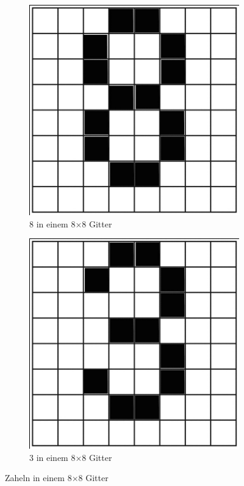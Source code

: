 \begin{figure}[H]
    \begin{subfigure}{.5\textwidth}
        \centering
        \includegraphics[width=.8\linewidth]{images/practice/numbers/8_in_8x8_grid.jpg}
        \caption{8 in einem 8×8 Gitter}
        \label{fig:8_in_8x8_grid}
    \end{subfigure}%
    \begin{subfigure}{.5\textwidth}
        \centering
        \includegraphics[width=.8\linewidth]{images/practice/numbers/3_in_8x8_grid.jpg}
        \caption{3 in einem 8×8 Gitter}
        \label{fig:3_in_8x8_grid}
    \end{subfigure}
    \caption{Zaheln in einem 8×8 Gitter}
    \label{fig:8x8_grid}
\end{figure}
